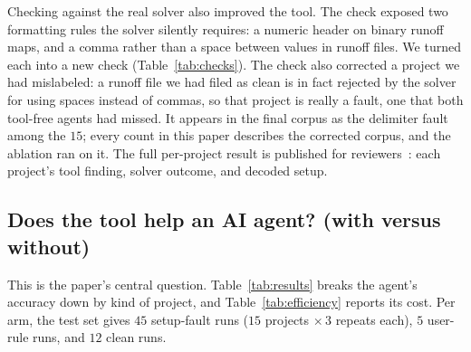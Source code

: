 \documentclass[conference]{IEEEtran}
\begin{document}
Checking against the real solver also improved the tool. The check exposed two formatting rules
the solver silently requires: a numeric header on binary runoff maps, and a comma rather than a
space between values in runoff files. We turned each into a new check
(Table~\ref{tab:checks}). The check also corrected a project we had mislabeled: a runoff file
we had filed as clean is in fact rejected by the solver for using spaces instead of commas, so
that project is really a fault, one that both tool-free agents had missed. It appears in the
final corpus as the delimiter fault among the $15$; every count in this paper describes the
corrected corpus, and the ablation ran on it. The full per-project
result is published for reviewers~\cite{artifact-oracle}: each project's tool finding, solver
outcome, and decoded setup.

\subsection{Does the tool help an AI agent? (with versus without)}
This is the paper's central question. Table~\ref{tab:results} breaks the agent's accuracy down by
kind of project, and Table~\ref{tab:efficiency} reports its cost. Per arm, the test set gives $45$
setup-fault runs ($15$ projects $\times\,3$ repeats each), $5$ user-rule runs, and $12$ clean
runs.

\begin{table}[!t]
\caption{Accuracy by kind of project, \emph{+tool} arm vs.\ \emph{bare} agent, with Wilson
$95\%$ intervals in brackets. \emph{found\%} is the blind-judged rate of naming the true fault;
\emph{stage\%} is how often the answer points at the right file or step on setup-fault projects;
\emph{clean accuracy} is the share of the $12$ clean projects correctly reported fault-free.
The setup-fault columns aggregate $45$ runs per arm and are the tightest; the Expect.\ and Clean
groups carry few runs ($5$ and $12$), so their intervals are wide.
Claude is \texttt{claude-sonnet-5}, Codex is \texttt{gpt-5.6-sol}.}
\label{tab:results}
\centering
\scriptsize
{}
\end{table}
\end{document}
